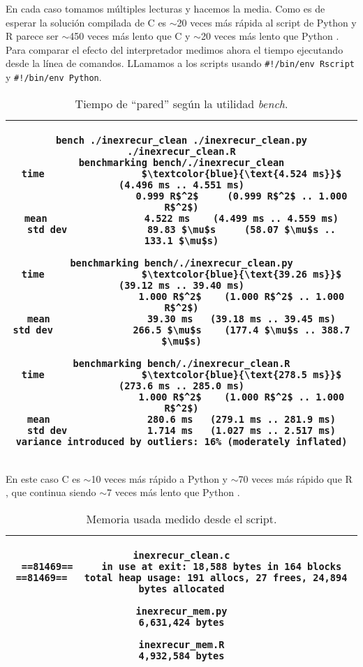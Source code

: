\documentclass{article}
\newcommand{\tempcaption}{}
\newenvironment{codesnip}[1]{
\begin{table}[h!]
\gdef\tempcaption{#1}
\centering
\begin{tabular}{|c|}
\hline}
{\\\hline
\end{tabular}
\caption{\tempcaption}
\end{table}}
\newcommand{\C}{C }
\newcommand{\R}{R }
\newcommand{\python}{Python }
\begin{document}
\vspace{-0.75cm}
En cada caso tomamos múltiples lecturas y hacemos la media. Como es de
esperar la solución compilada de \C{} es $\sim$20 veces más rápida al
script de \python y \R parece ser $\sim$450 veces más
lento que \C{} y $\sim$20 veces más lento que \python. Para
comparar el efecto del interpretador medimos ahora el tiempo
ejecutando desde la línea de comandos. LLamamos a los scripts usando
\texttt{\#!/bin/env Rscript} y \texttt{\#!/bin/env Python}.
\vspace{0.3cm}
\begin{codesnip}{Tiempo de ``pared'' según la utilidad \textit{bench}.}
\begin{lstlisting}
bench ./inexrecur_clean ./inexrecur_clean.py ./inexrecur_clean.R
benchmarking bench/./inexrecur_clean
time                 $\textcolor{blue}{\text{4.524 ms}}$           (4.496 ms .. 4.551 ms)
                     0.999 R$^2$     (0.999 R$^2$ .. 1.000 R$^2$)
mean                 4.522 ms    (4.499 ms .. 4.559 ms)
std dev              89.83 $\mu$s     (58.07 $\mu$s .. 133.1 $\mu$s)

benchmarking bench/./inexrecur_clean.py
time                 $\textcolor{blue}{\text{39.26 ms}}$           (39.12 ms .. 39.40 ms)
                     1.000 R$^2$    (1.000 R$^2$ .. 1.000 R$^2$)
mean                 39.30 ms   (39.18 ms .. 39.45 ms)
std dev              266.5 $\mu$s    (177.4 $\mu$s .. 388.7 $\mu$s)

benchmarking bench/./inexrecur_clean.R
time                 $\textcolor{blue}{\text{278.5 ms}}$           (273.6 ms .. 285.0 ms)
                     1.000 R$^2$    (1.000 R$^2$ .. 1.000 R$^2$)
mean                 280.6 ms   (279.1 ms .. 281.9 ms)
std dev              1.714 ms   (1.027 ms .. 2.517 ms)
variance introduced by outliers: 16% (moderately inflated)
\end{lstlisting}
\end{codesnip}

\vspace{-0.7cm}
En este caso \C{} es $\sim$10 veces más rápido a \python y $\sim$70
veces más rápido que \R, que continua siendo $\sim$7 veces más lento
que \python.

\clearpage
\begin{codesnip}{Memoria usada medido desde el script.}
\begin{lstlisting}
inexrecur_clean.c
==81469==     in use at exit: 18,588 bytes in 164 blocks
==81469==   total heap usage: 191 allocs, 27 frees, 24,894 bytes allocated

inexrecur_mem.py
6,631,424 bytes

inexrecur_mem.R
4,932,584 bytes
\end{lstlisting}
\end{codesnip}
\end{document}
